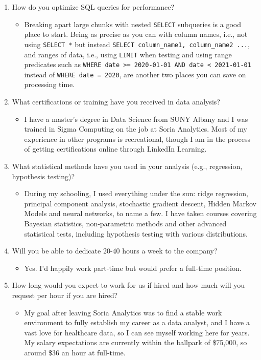 \documentclass[11pt]{article}
\newcommand{\answer}[1]{%
  \par\vspace{0.35em}%
  \begin{itemize}[label={},leftmargin=1.5em,topsep=0pt,partopsep=0pt,parsep=0pt,itemsep=0pt]
    \item #1
  \end{itemize}%
  \vspace{0.35em}%
}
\begin{document}
\begin{enumerate}[leftmargin=*]
    \item How do you optimize SQL queries for performance?
    \answer{Breaking apart large chunks with nested \texttt{SELECT} subqueries is a good place to start. Being as precise as you
    can with column names, i.e., not using \texttt{SELECT *} but instead \texttt{SELECT column\_name1, column\_name2 ...}, and
    ranges of data, i.e., using \texttt{LIMIT} when testing and using range predicates such as
    \texttt{WHERE date >= 2020-01-01 AND date < 2021-01-01} instead of \texttt{WHERE date = 2020},
    are another two places you can save on processing time.}

    \item What certifications or training have you received in data analysis?
    \answer{I have a master's degree in Data Science from SUNY Albany and I was trained in Sigma Computing on the job at 
    Soria Analytics. Most of my experience in other programs is recreational, though I am in the process of getting
    certifications online through LinkedIn Learning.}

    \item What statistical methods have you used in your analysis (e.g., regression, hypothesis testing)?
    \answer{During my schooling, I used everything under the sun: ridge regression, principal component analysis, 
    stochastic gradient descent, Hidden Markov Models and neural networks, to name a few. I have taken courses covering 
    Bayesian statistics, non-parametric methods and other advanced statistical tests, including hypothesis testing
    with various distributions.}

    \item Will you be able to dedicate 20-40 hours a week to the company?
    \answer{Yes. I'd happily work part-time but would prefer a full-time position.}

    \item How long would you expect to work for us if hired and how much will you request per hour if you are hired?
    \answer{My goal after leaving Soria Analytics was to find a stable work environment to fully establish my career
    as a data analyst, and I have a vast love for healthcare data, so I can see myself working here for years. My
    salary expectations are currently within the ballpark of \$75,000, so around \$36 an hour at full-time.}


\end{enumerate}
\end{document}
